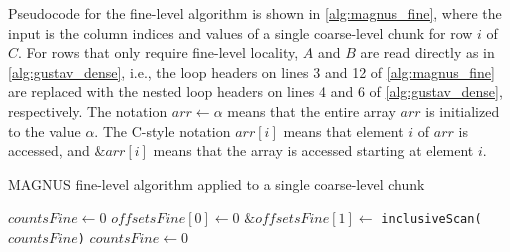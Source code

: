 Pseudocode for the fine-level algorithm is shown in \autoref{alg:magnus_fine}, where the input is the column indices and values of a single coarse-level chunk for row $i$ of $C$.
For rows that only require fine-level locality, $A$ and $B$ are read directly as in \autoref{alg:gustav_dense}, i.e.,
the loop headers on lines 3 and 12 of \autoref{alg:magnus_fine} are replaced with the nested loop headers on lines 4 and 6 of \autoref{alg:gustav_dense}, respectively.
The notation $arr \gets \alpha$ means that the entire array $arr$ is initialized to the value $\alpha$.
The C-style notation $arr[i]$ means that element $i$ of $arr$ is accessed, and $\&arr[i]$ means that the array is accessed starting at element $i$.

\begin{algorithm}[htbp]
    \small
    \DontPrintSemicolon
    \caption{MAGNUS fine-level algorithm applied to a single coarse-level chunk}\label{alg:magnus_fine}
    
    \;
    $countsFine\gets 0$\;
    \;
    $offsetsFine[0] \gets 0$\;
    $\&offsetsFine[1] \gets$ \texttt{inclusiveScan(}$countsFine$\texttt{)}\;
    \;
    $countsFine\gets 0$\;
    \;
\end{algorithm}

